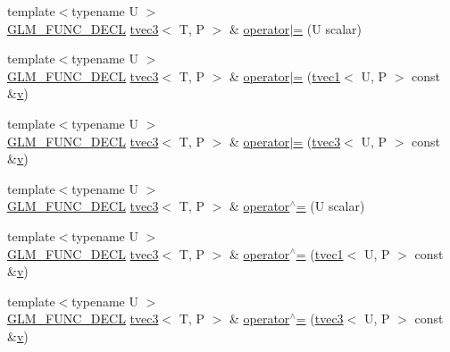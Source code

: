 \begin{DoxyCompactItemize}
\item 
{\footnotesize template$<$typename U $>$ }\\\mbox{\hyperlink{setup_8hpp_ab2d052de21a70539923e9bcbf6e83a51}{G\+L\+M\+\_\+\+F\+U\+N\+C\+\_\+\+D\+E\+CL}} \mbox{\hyperlink{structglm_1_1tvec3}{tvec3}}$<$ T, P $>$ \& \mbox{\hyperlink{structglm_1_1tvec3_af7ccac158b76afbc783f3f107396c319}{operator$\vert$=}} (U scalar)
\item 
{\footnotesize template$<$typename U $>$ }\\\mbox{\hyperlink{setup_8hpp_ab2d052de21a70539923e9bcbf6e83a51}{G\+L\+M\+\_\+\+F\+U\+N\+C\+\_\+\+D\+E\+CL}} \mbox{\hyperlink{structglm_1_1tvec3}{tvec3}}$<$ T, P $>$ \& \mbox{\hyperlink{structglm_1_1tvec3_a2fe619296352d6a5298b63b3d118bbeb}{operator$\vert$=}} (\mbox{\hyperlink{structglm_1_1tvec1}{tvec1}}$<$ U, P $>$ const \&\mbox{\hyperlink{glad_8h_a14cfbe2fc2234f5504618905b69d1e06}{v}})
\item 
{\footnotesize template$<$typename U $>$ }\\\mbox{\hyperlink{setup_8hpp_ab2d052de21a70539923e9bcbf6e83a51}{G\+L\+M\+\_\+\+F\+U\+N\+C\+\_\+\+D\+E\+CL}} \mbox{\hyperlink{structglm_1_1tvec3}{tvec3}}$<$ T, P $>$ \& \mbox{\hyperlink{structglm_1_1tvec3_a81a873ab5ca19d6bf3360a11f65d4f50}{operator$\vert$=}} (\mbox{\hyperlink{structglm_1_1tvec3}{tvec3}}$<$ U, P $>$ const \&\mbox{\hyperlink{glad_8h_a14cfbe2fc2234f5504618905b69d1e06}{v}})
\item 
{\footnotesize template$<$typename U $>$ }\\\mbox{\hyperlink{setup_8hpp_ab2d052de21a70539923e9bcbf6e83a51}{G\+L\+M\+\_\+\+F\+U\+N\+C\+\_\+\+D\+E\+CL}} \mbox{\hyperlink{structglm_1_1tvec3}{tvec3}}$<$ T, P $>$ \& \mbox{\hyperlink{structglm_1_1tvec3_a33635853bb12dc0ff6e828a805a20141}{operator$^\wedge$=}} (U scalar)
\item 
{\footnotesize template$<$typename U $>$ }\\\mbox{\hyperlink{setup_8hpp_ab2d052de21a70539923e9bcbf6e83a51}{G\+L\+M\+\_\+\+F\+U\+N\+C\+\_\+\+D\+E\+CL}} \mbox{\hyperlink{structglm_1_1tvec3}{tvec3}}$<$ T, P $>$ \& \mbox{\hyperlink{structglm_1_1tvec3_a5dd85e96e456dee71a1e62bfed87aaf5}{operator$^\wedge$=}} (\mbox{\hyperlink{structglm_1_1tvec1}{tvec1}}$<$ U, P $>$ const \&\mbox{\hyperlink{glad_8h_a14cfbe2fc2234f5504618905b69d1e06}{v}})
\item 
{\footnotesize template$<$typename U $>$ }\\\mbox{\hyperlink{setup_8hpp_ab2d052de21a70539923e9bcbf6e83a51}{G\+L\+M\+\_\+\+F\+U\+N\+C\+\_\+\+D\+E\+CL}} \mbox{\hyperlink{structglm_1_1tvec3}{tvec3}}$<$ T, P $>$ \& \mbox{\hyperlink{structglm_1_1tvec3_a31247f55bc34542e94c0928ad1c1e5e5}{operator$^\wedge$=}} (\mbox{\hyperlink{structglm_1_1tvec3}{tvec3}}$<$ U, P $>$ const \&\mbox{\hyperlink{glad_8h_a14cfbe2fc2234f5504618905b69d1e06}{v}})

\end{DoxyCompactItemize}
